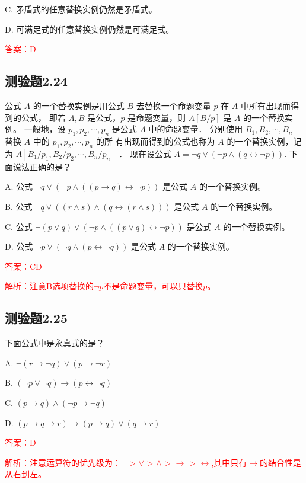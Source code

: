 \documentclass[UTF8, heading=true]{ctexart}
\begin{document}
C. 矛盾式的任意替换实例仍然是矛盾式。

D. 可满足式的任意替换实例仍然是可满足式。

\textcolor{red}{答案：D}

\subsection{测验题2.24}

公式 $A$ 的一个替换实例是用公式 $B$ 去替换一个命题变量 $p$ 在 $A$ 中所有出现而得到的公式，
即若 $A, B$ 是公式，$p$ 是命题变量，则 $A[B / p]$ 是 $A$ 的一个替换实例。
一般地，设 $p_1, p_2, \cdots, p_n$ 是公式 $A$ 中的命题变量．
分别使用 $B_1, B_2, \cdots, B_n$ 替换 $A$ 中的 $p_1, p_2, \cdots, p_n$ 的所
有出现而得到的公式也称为 $A$ 的一个替换实例，记为 $A\left[B_1 / p_1, B_2 / p_2, \cdots, B_n / p_n\right]$ ．
现在设公式 $A=\neg q \vee(\neg p \wedge(q \leftrightarrow \neg p))$.
 下面说法正确的是？

A. 
公式 $\neg q \vee(\neg p \wedge((p \rightarrow q) \leftrightarrow \neg p))$ 是公式 $A$ 的一个替换实例。

B. 
公式 $\neg q \vee((r \wedge s) \wedge(q \leftrightarrow(r \wedge s)))$ 是公式 $A$ 的一个替换实例。

C. 
公式 $\neg(p \vee q) \vee(\neg p \wedge((p \vee q) \leftrightarrow \neg p))$ 是公式 $A$ 的一个替换实例。

D. 
公式 $\neg p \vee(\neg q \wedge(p \leftrightarrow \neg q))$ 是公式 $A$ 的一个替换实例。


\textcolor{red}{答案：CD}

\textcolor{red}{解析：注意B选项替换的$\neg p$不是命题变量，可以只替换$p$。}

\subsection{测验题2.25}

下面公式中是永真式的是？

A. $ \neg(r \rightarrow \neg q) \vee(p \rightarrow \neg r)$

B. $(\neg p \vee \neg q) \rightarrow(p \leftrightarrow \neg q)$

C. $(p \rightarrow q) \wedge(\neg p \rightarrow \neg q)$

D. $(p \rightarrow q \rightarrow r) \rightarrow(p \rightarrow q) \vee(q \rightarrow r)$

\textcolor{red}{答案：D}

\textcolor{red}{解析：注意运算符的优先级为：$\neg$ >  $\vee$ > $\wedge$ > $\rightarrow$ > $\leftrightarrow$,其中只有$\rightarrow$的结合性是从右到左。}
\end{document}
